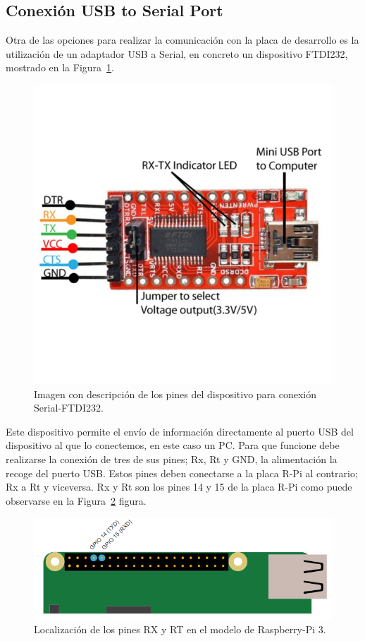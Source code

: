\subsection{Conexión USB to Serial Port}
Otra de las opciones para realizar la comunicación con la placa de desarrollo es la utilización de un adaptador USB a Serial, en concreto un dispositivo FTDI232, mostrado en la Figura~\ref{fig:serial}.

\begin{figure}[tbh]
\centering
\includegraphics[scale=0.5]{images/serial.png}
\caption[Descripción pines para FTDI232]{Imagen con descripción de los pines del dispositivo para conexión Serial-FTDI232.}%
\label{fig:serial}
\end{figure}

Este dispositivo permite el envío de información directamente al puerto USB del dispositivo al que lo conectemos, en este caso un PC. Para que funcione debe realizarse la conexión de tres de sus pines; Rx, Rt y GND, la alimentación la recoge del puerto USB. Estos pines deben conectarse a la placa R-Pi al contrario; Rx a Rt y viceversa. Rx y Rt son los pines 14 y 15 de la placa R-Pi como puede observarse en la Figura~\ref{fig:Rxrt} figura. 

\begin{figure}[tbh]
\centering
\includegraphics[scale=0.7]{images/serialRasp.png}
\caption[Configuración RX y RT en Raspberry Pi 3]{Localización de los pines RX y RT en el modelo de Raspberry-Pi 3.}%
\label{fig:Rxrt}
\end{figure}


